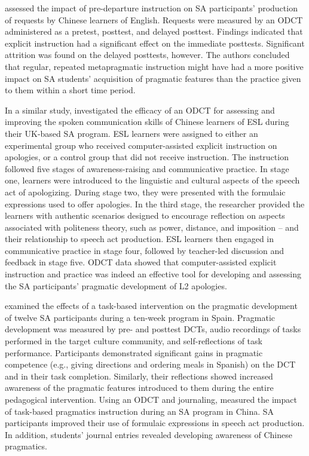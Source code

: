 \documentclass[output=paper]{langscibook}
\begin{document}
  \citet{HalenkoJones2017} assessed the impact of pre-departure instruction on SA participants’ production of requests by Chinese learners of English. Requests were measured by an ODCT administered as a pretest, posttest, and delayed posttest. Findings indicated that explicit instruction had a significant effect on the immediate posttests. Significant attrition was found on the delayed posttests, however. The authors concluded that regular, repeated metapragmatic instruction might have had a more positive impact on SA students’ acquisition of pragmatic features than the practice given to them within a short time period.

  In a similar study, \citet{Halenko2018} investigated the efficacy of an ODCT for assessing and improving the spoken communication skills of Chinese learners of ESL during their UK-based SA program. ESL learners were assigned to either an experimental group who received computer-assisted explicit instruction on apologies, or a control group that did not receive instruction. The instruction followed  five stages of awareness-raising and communicative practice. In stage one, learners were introduced to the linguistic and cultural aspects of the speech act of apologizing. During stage two, they were presented with the formulaic expressions used to offer apologies. In the third stage, the researcher provided the learners with authentic scenarios designed to encourage reflection on aspects associated with  politeness theory, such as power, distance, and imposition -- and their relationship to speech act production. ESL learners then engaged in communicative practice in stage four, followed by teacher-led discussion and feedback in stage five. ODCT data showed that computer-assisted explicit instruction and practice was indeed an effective tool for developing and assessing the SA participants’ pragmatic development of L2 apologies.

\begin{sloppypar}
  \citet{Morris2017} examined the effects of a task-based intervention on the pragmatic development of twelve SA participants during a ten-week program in Spain. Pragmatic development was measured by pre- and posttest DCTs, audio recordings of tasks performed in the target culture community, and self-reflections of task performance. Participants demonstrated significant gains in pragmatic competence (e.g., giving directions and ordering meals in Spanish) on the DCT and in their task completion. Similarly, their reflections showed increased awareness of the pragmatic features introduced to them during the entire pedagogical intervention. Using an ODCT and journaling, \citet{WinkeTeng2010} measured the impact of task-based pragmatics instruction during an SA program in China. SA participants improved their use of formulaic expressions in speech act production. In addition, students’ journal entries revealed developing awareness of Chinese pragmatics.
\end{sloppypar}
\end{document}
